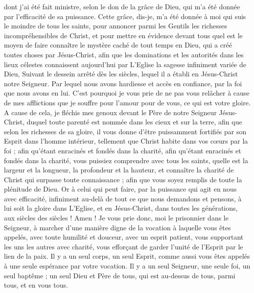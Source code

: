 \begin{multicols}{2}
dont j'ai été fait ministre, selon le don de la grâce de Dieu, qui m'a été donnée par l'efficacité de sa puissance.
Cette grâce, dis-je, m'a été donnée à moi qui suis le moindre de tous les saints, pour annoncer parmi les Gentils les richesses incompréhensibles de Christ,
et pour mettre en évidence devant tous quel est le moyen de faire connaître le mystère caché de tout temps en Dieu, qui a créé toutes choses par Jésus-Christ,
afin que les dominations et les autorités dans les lieux célestes connaissent aujourd'hui par L'Eglise la sagesse infiniment variée de Dieu,
Suivant le dessein arrêté dès les siècles, lequel il a établi en Jésus-Christ notre Seigneur.
Par lequel nous avons hardiesse et accès en confiance, par la foi que nous avons en lui.
 C'est pourquoi je vous prie de ne pas vous relâcher à cause de mes afflictions que je souffre pour l'amour pour de vous, ce qui est votre gloire.
A cause de cela, je fléchis mes genoux devant le Père de notre Seigneur Jésus-Christ,
duquel toute parenté est nommée dans les cieux et sur la terre,
afin que selon les richesses de sa gloire, il vous donne d'être puissamment fortifiés par son Esprit dans l'homme intérieur,
tellement que Christ habite dans vos cœurs par la foi ; afin qu'étant enracinés et fondés dans la charité,
afin qu'étant enracinés et fondés dans la charité, vous puissiez comprendre avec tous les saints, quelle est la largeur et la longueur, la profondeur et la hauteur,
et connaître la charité de Christ qui surpasse toute connaissance ; afin que vous soyez remplis de toute la plénitude de Dieu.
Or à celui qui peut faire, par la puissance qui agit en nous avec efficacité, infiniment au-delà de tout ce que nous demandons et pensons,
à lui soit la gloire dans L'Eglise, et en Jésus-Christ, dans toutes les générations, aux siècles des siècles ! Amen !
\VerseOne{}Je vous prie donc, moi le prisonnier dans le Seigneur, à marcher d'une manière digne de la vocation à laquelle vous êtes appelés,
avec toute humilité et douceur, avec un esprit patient, vous supportant les uns les autres avec charité,
vous efforçant de garder l'unité de l'Esprit par le lien de la paix.
Il y a un seul corps, un seul Esprit, comme aussi vous êtes appelés à une seule espérance par votre vocation.
Il y a un seul Seigneur, une seule foi, un seul baptême ;
un seul Dieu et Père de tous, qui est au-dessus de tous, parmi tous, et en vous tous.

\end{multicols}

